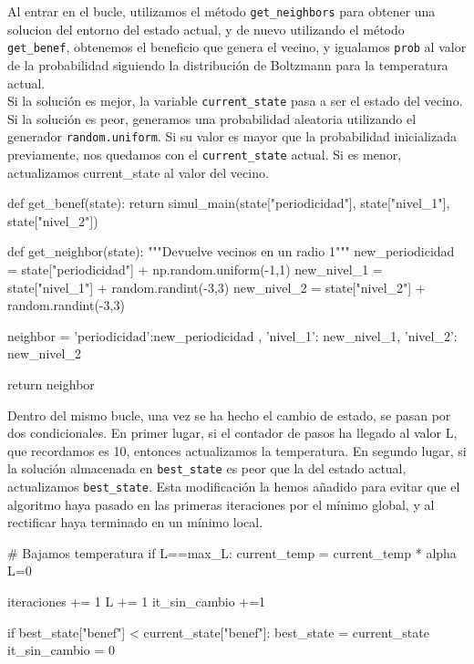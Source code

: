 \documentclass[a4paper,12pt]{article}
\begin{document}
	Al entrar en el bucle, utilizamos el método \texttt{get\_neighbors} para obtener una solucion del entorno del estado actual, y de nuevo utilizando el método \texttt{get\_benef}, obtenemos el beneficio que genera el vecino, y igualamos \texttt{prob} al valor de la probabilidad siguiendo la distribución de Boltzmann para la temperatura actual. \\
	
	Si la solución es mejor, la variable \texttt{current\_state} pasa a ser el estado del vecino.
	Si la solución es peor, generamos una probabilidad aleatoria utilizando el generador \texttt{random.uniform}. Si su valor es mayor que la probabilidad inicializada previamente,
	nos quedamos con el \texttt{current\_state} actual. Si es menor, actualizamos current\_state al valor del vecino.\\

	\begin{python}	
def get_benef(state):
  		return simul_main(state["periodicidad"],
  		                  state["nivel_1"], state["nivel_2"])

def get_neighbor(state):
	"""Devuelve vecinos en un radio 1"""
	new_periodicidad = state["periodicidad"] +  np.random.uniform(-1,1)
	new_nivel_1 = state["nivel_1"] +  random.randint(-3,3)
	new_nivel_2 = state["nivel_2"] +  random.randint(-3,3)

	neighbor = {'periodicidad':new_periodicidad ,  
					'nivel_1': new_nivel_1,
					'nivel_2': new_nivel_2 }

	return neighbor
	\end{python}		

	Dentro del mismo bucle, una vez se ha hecho el cambio de estado, se pasan por dos condicionales. En primer lugar, si el contador de pasos ha llegado al valor L, que recordamos es 10, entonces
	actualizamos la temperatura. En segundo lugar, si la solución almacenada en \texttt{best\_state} es peor que la del estado actual, actualizamos \texttt{best\_state}.
	Esta modificación la hemos añadido para evitar que el algoritmo haya pasado en las primeras iteraciones por el mínimo global, y al rectificar haya terminado en un mínimo local.\\

	\begin{python}
	# Bajamos temperatura
	if L==max_L:
		current_temp = current_temp * alpha
		L=0
	
	iteraciones += 1
	L += 1
	it_sin_cambio +=1 
	
	if best_state["benef"] < current_state["benef"]:
		best_state = current_state		it_sin_cambio = 0
	\end{python}
\end{document}
